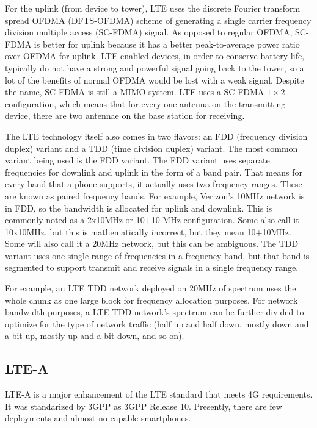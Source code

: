 For the uplink (from device to tower), LTE uses the  discrete Fourier transform spread OFDMA (DFTS-OFDMA) scheme of generating a single carrier frequency division multiple access (SC-FDMA) signal. As opposed to regular OFDMA, SC-FDMA is better for uplink because it has a better peak-to-average power ratio over OFDMA for uplink. LTE-enabled devices, in order to conserve battery life, typically do not have a strong and powerful signal going back to the tower, so a lot of the benefits of normal OFDMA would be lost with a weak signal. Despite the name, SC-FDMA is still a MIMO system. LTE uses a SC-FDMA $1\times2$ configuration, which means that for every one antenna on the transmitting device, there are two antennae on the base station for receiving.

The LTE technology itself also comes in two flavors: an FDD (frequency division duplex) variant and a TDD (time division duplex) variant. The most common variant being used is the FDD variant. The FDD variant uses separate frequencies for downlink and uplink in the form of a band pair. That means for every band that a phone supports, it actually uses two frequency ranges. These are known as paired frequency bands. For example, Verizon’s 10MHz network is in FDD, so the bandwidth is allocated for uplink and downlink. This is commonly noted as a 2x10MHz or 10+10 MHz configuration. Some also call it 10x10MHz, but this is mathematically incorrect, but they mean 10+10MHz. Some will also call it a 20MHz network, but this can be ambiguous. The TDD variant uses one single range of frequencies in a frequency band, but that band is segmented to support transmit and receive signals in a single frequency range.

For example, an LTE TDD network deployed on 20MHz of spectrum uses the whole chunk as one large block for frequency allocation purposes. For network bandwidth purposes, a LTE TDD network’s spectrum can be further divided to optimize for the type of network traffic (half up and half down, mostly down and a bit up, mostly up and a bit down, and so on).

\subsection{LTE-A}

LTE-A is a major enhancement of the LTE standard that meets 4G requirements. It was standarized by 3GPP as 3GPP Release 10. Presently, there are few deployments and almost no capable smartphones.

